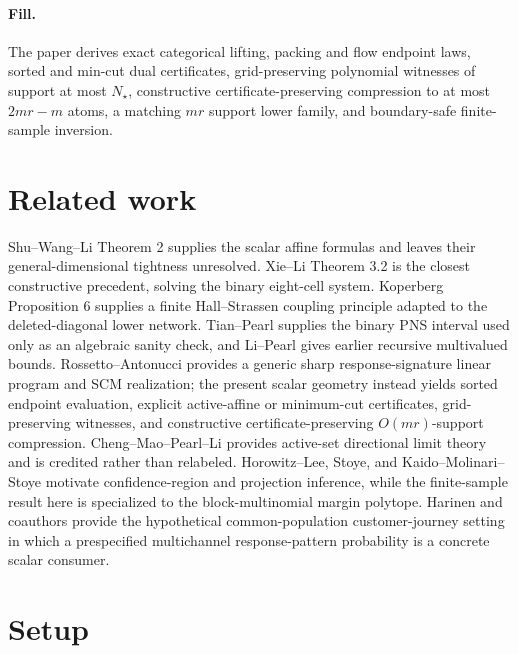 \documentclass{article}
\begin{document}
\paragraph{Fill.} The paper derives exact categorical lifting, packing and flow endpoint laws, sorted and min-cut dual certificates, grid-preserving polynomial witnesses of support at most \(N_\star\), constructive certificate-preserving compression to at most \(2mr-m\) atoms, a matching \(mr\) support lower family, and boundary-safe finite-sample inversion.

\section{Related work}

Shu--Wang--Li Theorem 2 supplies the scalar affine formulas and leaves their general-dimensional tightness unresolved.  Xie--Li Theorem 3.2 is the closest constructive precedent, solving the binary eight-cell system.  Koperberg Proposition 6 supplies a finite Hall--Strassen coupling principle adapted to the deleted-diagonal lower network.  Tian--Pearl supplies the binary PNS interval used only as an algebraic sanity check, and Li--Pearl gives earlier recursive multivalued bounds.  Rossetto--Antonucci provides a generic sharp response-signature linear program and SCM realization; the present scalar geometry instead yields sorted endpoint evaluation, explicit active-affine or minimum-cut certificates, grid-preserving witnesses, and constructive certificate-preserving \(O(mr)\)-support compression.  Cheng--Mao--Pearl--Li provides active-set directional limit theory and is credited rather than relabeled.  Horowitz--Lee, Stoye, and Kaido--Molinari--Stoye motivate confidence-region and projection inference, while the finite-sample result here is specialized to the block-multinomial margin polytope.  Harinen and coauthors provide the hypothetical common-population customer-journey setting in which a prespecified multichannel response-pattern probability is a concrete scalar consumer.

\section{Setup}
\end{document}
